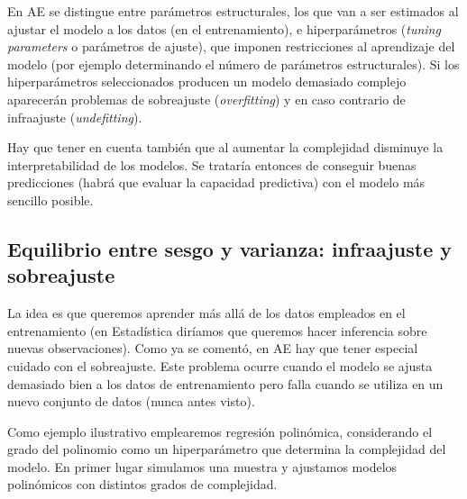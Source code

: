 \documentclass[
]{book}
\theoremstyle{break}
\theoremstyle{nonumberplain}
\begin{document}
En AE se distingue entre parámetros estructurales, los que van a ser estimados al ajustar el modelo a los datos (en el entrenamiento), e hiperparámetros (\emph{tuning parameters} o parámetros de ajuste), que imponen restricciones al aprendizaje del modelo (por ejemplo determinando el número de parámetros estructurales).
Si los hiperparámetros seleccionados producen un modelo demasiado complejo aparecerán problemas de sobreajuste (\emph{overfitting}) y en caso contrario de infraajuste (\emph{undefitting}).

Hay que tener en cuenta también que al aumentar la complejidad disminuye la interpretabilidad de los modelos.
Se trataría entonces de conseguir buenas predicciones (habrá que evaluar la capacidad predictiva) con el modelo más sencillo posible.

\hypertarget{bias-variance}{%
\subsection{Equilibrio entre sesgo y varianza: infraajuste y sobreajuste}\label{bias-variance}}

La idea es que queremos aprender más allá de los datos empleados en el entrenamiento (en Estadística diríamos que queremos hacer inferencia sobre nuevas observaciones).
Como ya se comentó, en AE hay que tener especial cuidado con el sobreajuste.
Este problema ocurre cuando el modelo se ajusta demasiado bien a los datos de entrenamiento pero falla cuando se utiliza en un nuevo conjunto de datos (nunca antes visto).

Como ejemplo ilustrativo emplearemos regresión polinómica, considerando el grado del polinomio como un hiperparámetro que determina la complejidad del modelo.
En primer lugar simulamos una muestra y ajustamos modelos polinómicos con distintos grados de complejidad.
\end{document}
